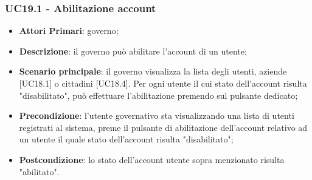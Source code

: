 \subsubsection{UC19.1 - Abilitazione account}
\begin{itemize}
	\item \textbf{Attori Primari}:
	governo;
	\item \textbf{Descrizione}: il governo può abilitare l'account di un utente;
	\item \textbf{Scenario principale}: il governo visualizza la lista degli utenti, aziende [UC18.1] o cittadini [UC18.4]. Per ogni utente il cui stato dell'account risulta "disabilitato", può effettuare l'abilitazione premendo sul pulsante dedicato;

	\item \textbf{Precondizione}: l'utente governativo sta visualizzando una lista di utenti registrati al sistema, preme il pulsante di abilitazione dell'account relativo ad un utente il quale stato dell'account risulta "disabilitato";
	\item \textbf{Postcondizione}: lo stato  dell'account utente sopra menzionato risulta "abilitato".
\end{itemize} 


